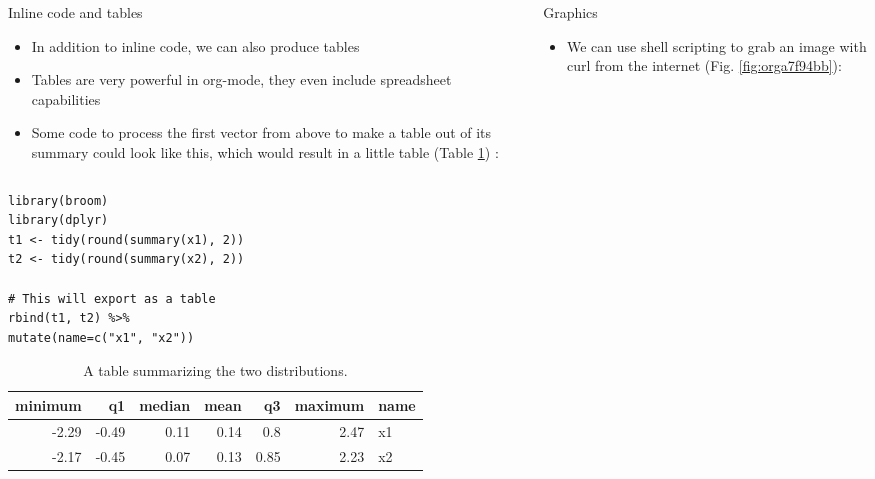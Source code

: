 \documentclass[final]{beamer}
\begin{document}
\begin{frame}[fragile,label={sec:org954d466}]{}
\begin{columns}
\begin{column}[t]{0.45\columnwidth}
\begin{block}{Inline code and tables}
\begin{itemize}
\item In addition to inline code, we can also produce tables
\item Tables are very powerful in org-mode, they even include spreadsheet
capabilities
\item Some code to process the first vector from above to make a table out
of its summary could look like this, which would result in a little
table (Table \ref{tab:orgd66dcb7}) :
\end{itemize}

\begin{columns}
\begin{column}[T]{0.78\columnwidth}
\begin{verbatim}
library(broom)
library(dplyr)
t1 <- tidy(round(summary(x1), 2)) 
t2 <- tidy(round(summary(x2), 2))

# This will export as a table
rbind(t1, t2) %>%
mutate(name=c("x1", "x2"))
\end{verbatim}

\vspace{2cm}

\begin{table}[htbp]
\caption{\label{tab:orgd66dcb7}
A table summarizing the two distributions.}
\centering
\begin{tabular}{rrrrrrl}
\hline
minimum & q1 & median & mean & q3 & maximum & name\\
\hline
-2.29 & -0.49 & 0.11 & 0.14 & 0.8 & 2.47 & x1\\
-2.17 & -0.45 & 0.07 & 0.13 & 0.85 & 2.23 & x2\\
\hline
\end{tabular}
\end{table}
\end{column}
\end{columns}
\end{block}
\end{column}

\begin{column}[t]{0.45\columnwidth}
\begin{block}{Graphics}
\begin{itemize}
\item We can use shell scripting to grab an image with curl from the
internet (Fig. \ref{fig:orga7f94bb}):
\end{itemize}


\end{block}
\end{column}
\end{columns}
\end{frame}
\end{document}

